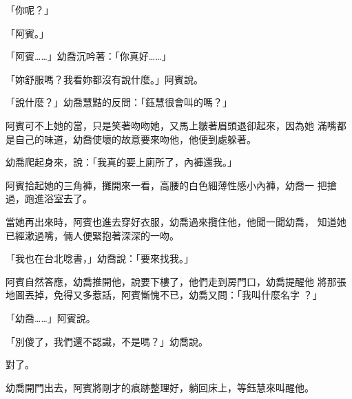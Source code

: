 「你呢？」

「阿賓。」

「阿賓……」幼喬沉吟著：「你真好……」

「妳舒服嗎？我看妳都沒有說什麼。」阿賓說。

「說什麼？」幼喬慧黠的反問：「鈺慧很會叫的嗎？」

阿賓可不上她的當，只是笑著吻吻她，又馬上皺著眉頭退卻起來，因為她
滿嘴都是自己的味道，幼喬使壞的故意要來吻他，他便到處躲著。

幼喬爬起身來，說：「我真的要上廁所了，內褲還我。」

阿賓拾起她的三角褲，攤開來一看，高腰的白色細薄性感小內褲，幼喬一
把搶過，跑進浴室去了。

當她再出來時，阿賓也進去穿好衣服，幼喬過來攬住他，他聞一聞幼喬，
知道她已經漱過嘴，倆人便緊抱著深深的一吻。

「我也在台北唸書，」幼喬說：「要來找我。」

阿賓自然答應，幼喬推開他，說要下樓了，他們走到房門口，幼喬提醒他
將那張地圖丟掉，免得又多惹話，阿賓慚愧不已，幼喬又問：「我叫什麼名字
？」

「幼喬……」阿賓說。

「別傻了，我們還不認識，不是嗎？」幼喬說。

對了。

幼喬開門出去，阿賓將剛才的痕跡整理好，躺回床上，等鈺慧來叫醒他。










